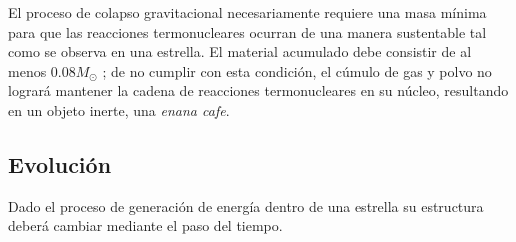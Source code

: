 
El proceso de colapso gravitacional necesariamente requiere una masa mínima para
que las reacciones termonucleares ocurran de una manera sustentable tal como se
observa en una estrella. El material acumulado debe consistir de al menos $0.08
M_{\odot}$ \citet*{anIntroStellarAstro::chapter2_stellarFormation}; de no
cumplir con esta condición, el cúmulo de gas y polvo no logrará mantener la
cadena de reacciones termonucleares en su núcleo, resultando en un objeto
inerte, una \textit{enana cafe}.

\subsection{Evolución}

Dado el proceso de generación de energía dentro de una estrella su estructura deberá cambiar mediante el paso del tiempo. 